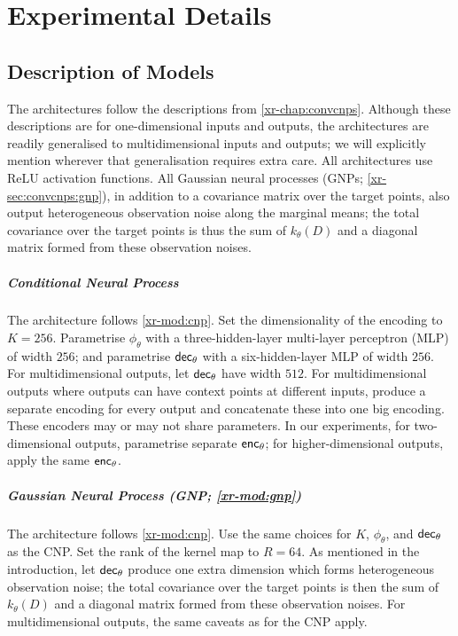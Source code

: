 \documentclass[12pt]{report}
\newcommand{\xrprefix}[1]{xr-#1}
\begin{document}
\chapter{Experimental Details}
\label{app:experimental_details}

\section{Description of Models}
\label{sec:experimental_details:models}

The architectures follow the descriptions from \cref{\xrprefix{chap:convcnps}}.
Although these descriptions are for one-dimensional inputs and outputs, the architectures are readily generalised to multidimensional inputs and outputs;
we will explicitly mention
wherever that generalisation requires extra care.
All architectures use ReLU activation functions.
All Gaussian neural processes (GNPs; \cref{\xrprefix{sec:convcnps:gnp}}),
in addition to a covariance matrix over the target points,
also output heterogeneous observation noise along the marginal means;
the total covariance over the target points is thus the sum of $k_\theta(D)$ and a diagonal matrix formed from these observation noises.

\paragraph{Conditional Neural Process \parencite[CNP;][]{Garnelo:2018:Conditional_Neural_Processes}}
The architecture follows \cref{\xrprefix{mod:cnp}}.
Set the dimensionality of the encoding to $K = 256$.
Parametrise $\phi_\theta$ with a three-hidden-layer multi-layer perceptron (MLP) of width $256$;
and parametrise $\mathsf{dec}_\theta$ with a six-hidden-layer MLP of width $256$.
For multidimensional outputs, let $\mathsf{dec}_\theta$ have width $512$.
For multidimensional outputs where outputs can have context points at different inputs, produce a separate encoding for every output and concatenate these into one big encoding.
These encoders may or may not share parameters.
In our experiments, for two-dimensional outputs, parametrise separate $\mathsf{enc}_\theta$;
for higher-dimensional outputs, apply the same $\mathsf{enc}_\theta$.

\paragraph{Gaussian Neural Process (GNP; \cref{\xrprefix{mod:gnp}})}
The architecture follows \cref{\xrprefix{mod:cnp}}.
Use the same choices for $K$, $\phi_\theta$, and $\mathsf{dec}_\theta$ as the CNP.
Set the rank of the kernel map to $R = 64$.
As mentioned in the introduction, let $\mathsf{dec}_\theta$ produce one extra dimension which forms heterogeneous observation noise;
the total covariance over the target points is then the sum of $k_\theta(D)$ and a diagonal matrix formed from these observation noises.
For multidimensional outputs, the same caveats as for the CNP apply.
\end{document}
